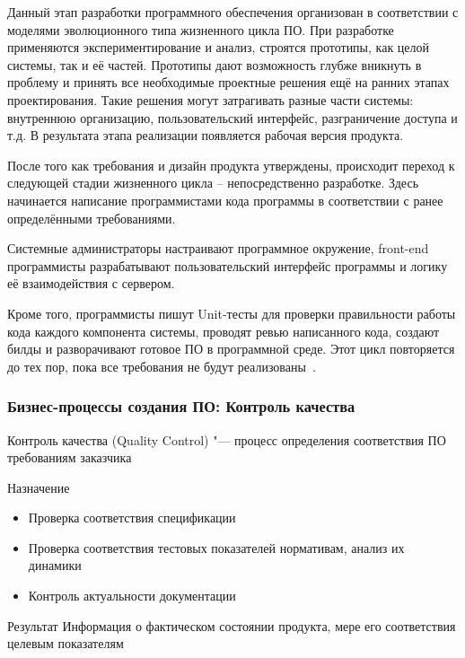 \documentclass{../industrial-development}
\begin{document}
Данный этап разработки программного обеспечения организован в соответствии с моделями эволюционного типа жизненного цикла ПО. При разработке применяются экспериментирование и анализ, строятся прототипы, как целой системы, так и её частей. Прототипы дают возможность глубже вникнуть в проблему и принять все необходимые проектные решения ещё на ранних этапах проектирования. Такие решения могут затрагивать разные части системы: внутреннюю организацию, пользовательский интерфейс, разграничение доступа и т.д. В результата этапа реализации появляется рабочая версия продукта.

После того как требования и дизайн продукта утверждены, происходит переход к следующей стадии жизненного цикла – непосредственно разработке. Здесь начинается написание программистами кода программы в соответствии с ранее определёнными требованиями.

Системные администраторы настраивают программное окружение, front-end программисты разрабатывают пользовательский интерфейс программы и логику её взаимодействия с сервером.

Кроме того, программисты пишут Unit-тесты для проверки правильности работы кода каждого компонента системы, проводят ревью написанного кода, создают билды и разворачивают готовое ПО в программной среде. Этот цикл повторяется до тех пор, пока все требования не будут реализованы~\cite{Abolut,Qalight}.


\begin{frame} \frametitle{Бизнес-процессы создания ПО: Контроль качества}
	\begin{block}{}
		\alert{Контроль качества} (Quality Control) "--- процесс определения соответствия ПО требованиям заказчика
	\end{block}
	\begin{block}{Назначение}
		\begin{itemize}
			\item Проверка соответствия спецификации
			\item Проверка соответствия тестовых показателей нормативам, анализ их динамики
			\item Контроль актуальности документации
		\end{itemize}
	\end{block}
	\begin{block}{Результат}
		Информация о фактическом состоянии продукта, мере его соответствия целевым показателям
	\end{block}
\end{frame}
\end{document}
